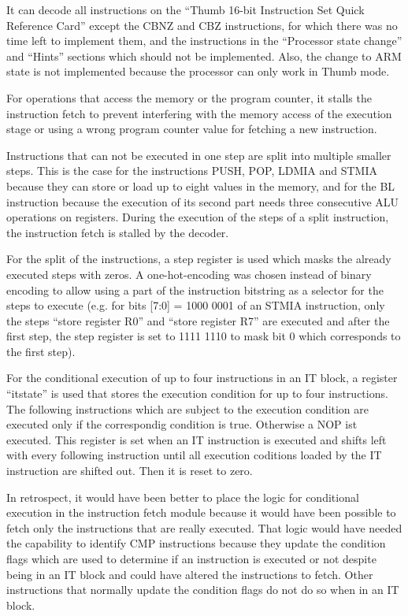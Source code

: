 It can decode all instructions on the ``Thumb 16-bit Instruction Set Quick Reference Card'' except the CBNZ and CBZ instructions, for which there was no time left to implement them, and the instructions in the ``Processor state change''   and ``Hints'' sections which should not be implemented. Also, the change to ARM state is not implemented because the processor can only work in Thumb mode.

For operations that access the memory or the program counter, it stalls the instruction fetch to prevent interfering with the memory access of the execution stage or using a wrong program counter value for fetching a new instruction. 

Instructions that can not be executed in one step are split into multiple smaller steps. This is the case for the instructions PUSH, POP, LDMIA and STMIA because they can store or load up to eight values in the memory, and for the BL instruction because the execution of its second part needs three consecutive ALU operations on registers. During the execution of the steps of a split instruction, the instruction fetch is stalled by the decoder.

For the split of the instructions, a step register is used which masks the already executed steps with zeros. A one-hot-encoding was chosen instead of binary encoding to allow using a part of the instruction bitstring as a selector for the steps to execute (e.g. for bits [7:0] = 1000 0001 of an STMIA instruction, only the steps ``store register R0'' and ``store register R7'' are executed and after the first step, the step register is set to 1111 1110 to mask bit 0 which corresponds to the first step).

For the conditional execution of up to four instructions in an IT block, a register ``itstate'' is used that stores the execution condition for up to four instructions. The following instructions which are subject to the execution condition are executed only if the correspondig condition is true. Otherwise a NOP ist executed. This register is set when an IT instruction is executed and shifts left with every following instruction until all execution coditions loaded by the IT instruction are shifted out. Then it is reset to zero. 


In retrospect, it would have been better to place the logic for conditional execution in the instruction fetch module because it would have been possible to fetch only the instructions that are really executed. That logic would have needed the capability to identify CMP instructions because they update the condition flags which are used to determine if an instruction is executed or not despite being in an IT block and could have altered the instructions to fetch. Other instructions that normally update the condition flags do not do so when in an IT block.

